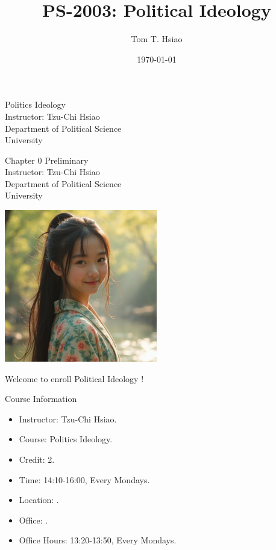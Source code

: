\documentclass{beamer}
\title{PS-2003: Political Ideology}
\author{Tom T. Hsiao}
\date{\today}
\begin{document}
\begin{frame}
\begin{center}
\Large{Politics Ideology} \\
\vspace{3em}
\normalsize{Instructor: Tzu-Chi Hsiao} \\
\vspace{3em}
\small{Department of Political Science} \\
\vspace{1em}
\small{University}
\end{center}
\end{frame}
\begin{frame}
\begin{center}
\Large{Chapter 0 Preliminary} \\
\vspace{3em}
\normalsize{Instructor: Tzu-Chi Hsiao} \\
\vspace{3em}
\small{Department of Political Science} \\
\vspace{1em}
\small{University} \\
\end{center}
\end{frame}
\begin{frame}{}
\begin{center}
\includegraphics[width=0.5\textwidth]{instructor.png}
\end{center}
\vspace{1em}
\begin{center}
\Large{Welcome to enroll Political Ideology !}
\end{center}
\end{frame}
\begin{frame}{Course Information}
\begin{itemize}
\item Instructor: Tzu-Chi Hsiao.
\item Course: Politics Ideology.
\item Credit: 2.
\item Time: 14:10-16:00, Every Mondays.
\item Location: . 
\item Office: .
\item Office Hours: 13:20-13:50, Every Mondays.
\end{itemize}
\end{frame}
\end{document}
